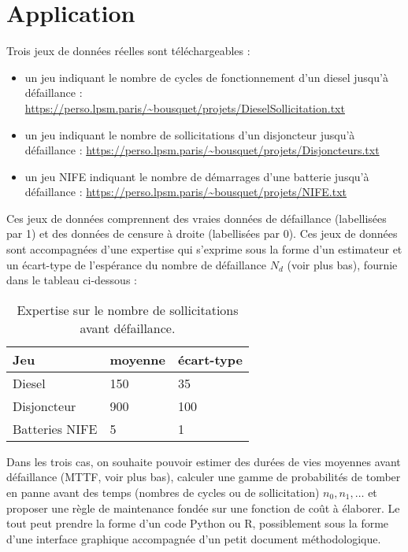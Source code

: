 \documentclass[10pt]{article}
\newcommand{\1}{\mathbbm{1}}
\begin{document}
\section{Application}

Trois jeux de donn\'ees r\'eelles sont t\'el\'echargeables :
\begin{itemize}
\item un jeu indiquant le nombre de cycles de fonctionnement d'un diesel jusqu'\`a d\'efaillance : \url{https://perso.lpsm.paris/~bousquet/projets/DieselSollicitation.txt}
\item un jeu indiquant le nombre de sollicitations d'un disjoncteur jusqu'\`a d\'efaillance : \url{https://perso.lpsm.paris/~bousquet/projets/Disjoncteurs.txt} \\
\item un jeu NIFE indiquant le nombre de d\'emarrages d'une batterie jusqu'\`a d\'efaillance : \url{https://perso.lpsm.paris/~bousquet/projets/NIFE.txt} 
\end{itemize}
Ces jeux de donn\'ees comprennent des vraies donn\'ees de d\'efaillance (labellis\'ees par 1) et des donn\'ees de censure \`a droite (labellis\'ees par 0). Ces jeux de donn\'ees sont accompagn\'ees d'une expertise qui s'exprime sous la forme d'un estimateur et un \'ecart-type de l'esp\'erance du nombre de d\'efaillance $N_d$ (voir plus bas), fournie dans le tableau ci-dessous :

\begin{table}[hbtp]
\centering
\begin{tabular}{lll}
Jeu & moyenne & \'ecart-type \\
\hline
Diesel & 150 & 35 \\
Disjoncteur & 900 & 100 \\
Batteries NIFE & 5 & 1 \\
\hline
\end{tabular}
\caption{Expertise  sur le nombre de sollicitations avant d\'efaillance.}
\label{expert1}
\end{table}


Dans les trois cas, on souhaite pouvoir estimer des dur\'ees de vies moyennes avant d\'efaillance (MTTF, voir plus bas), calculer une gamme de probabilit\'es de tomber en panne avant des temps (nombres de cycles ou de sollicitation) $n_0,n_1,\ldots$ et proposer une r\`egle de maintenance fond\'ee sur une fonction de coût \`a \'elaborer. Le tout peut prendre la forme d'un code Python ou R, possiblement sous la forme d'une interface graphique accompagn\'ee d'un petit document m\'ethodologique. \\
\end{document}
